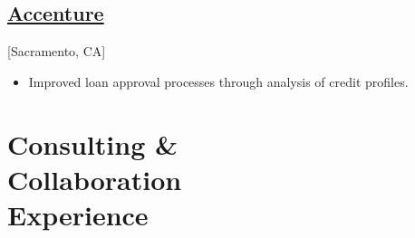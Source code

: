 \documentclass{wm_cv}
\begin{document}
\subsection{\href{https://en.wikipedia.org/wiki/Accenture}{Accenture}}[Sacramento, CA]
\begin{positions}
\end{positions}

\begin{itemize}
  \item Improved loan approval processes through analysis of credit profiles. 
\end{itemize}









\section{Consulting \& \\ Collaboration \\ Experience}
\end{document}
